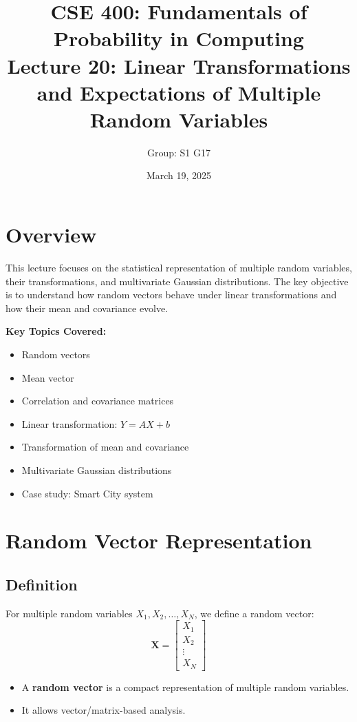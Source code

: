 \documentclass[12pt]{article}
\title{\textbf{CSE 400: Fundamentals of Probability in Computing}\\
Lecture 20: Linear Transformations and Expectations of Multiple Random Variables}
\author{Group: S1 G17}
\date{March 19, 2025}
\begin{document}
\maketitle

\section*{Overview}
This lecture focuses on the statistical representation of multiple random variables, their transformations, and multivariate Gaussian distributions. The key objective is to understand how random vectors behave under linear transformations and how their mean and covariance evolve.

\textbf{Key Topics Covered:}
\begin{itemize}
    \item Random vectors
    \item Mean vector
    \item Correlation and covariance matrices
    \item Linear transformation: $Y = AX + b$
    \item Transformation of mean and covariance
    \item Multivariate Gaussian distributions
    \item Case study: Smart City system
\end{itemize}

\section{Random Vector Representation}
\subsection{Definition}
For multiple random variables $X_1, X_2, \dots, X_N$, we define a random vector:
\[
\mathbf{X} = 
\begin{bmatrix}
X_1 \\
X_2 \\
\vdots \\
X_N
\end{bmatrix}
\]

\begin{itemize}
    \item A \textbf{random vector} is a compact representation of multiple random variables.
    \item It allows vector/matrix-based analysis.
\end{itemize}
\end{document}

